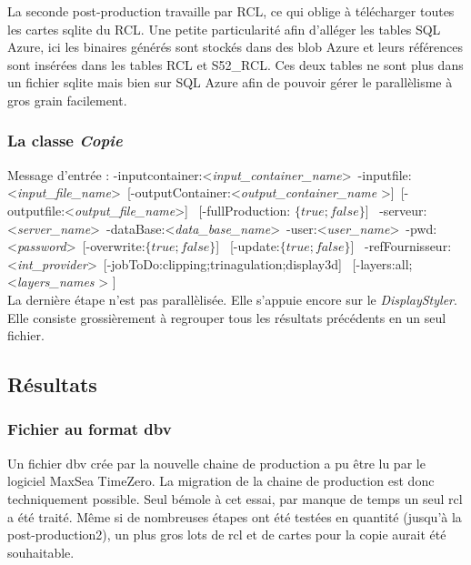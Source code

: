 La seconde post-production travaille par RCL, ce qui oblige à
télécharger toutes les cartes sqlite du RCL. Une petite particularité
afin d'alléger les tables SQL Azure, ici les binaires générés sont
stockés dans des blob Azure et leurs références sont insérées dans les
tables RCL et S52\_RCL. Ces deux tables ne sont plus dans un fichier
sqlite mais bien sur SQL Azure afin de pouvoir gérer le parallèlisme à
gros grain facilement.

\subsubsection{La classe \textit{Copie}}
Message d'entrée : 
-inputcontainer:\textless \textit{input\_container\_name}\textgreater \   
-inputfile:\textless \textit{input\_file\_name}\textgreater \ 
[-outputContainer:\textless \textit{output\_container\_name} \textgreater ]\  
[-outputfile:\textless \textit{output\_file\_name}\textgreater ] \ 
[-fullProduction: $\{true;false\}$] \ 
-serveur:\textless \textit{server\_name}\textgreater \   
-dataBase:\textless \textit{data\_base\_name}\textgreater \   
-user:\textless \textit{user\_name}\textgreater  \ 
-pwd:\textless \textit{password}\textgreater  \ 
[-overwrite:$\{true;false\}$] \ 
[-update:$\{true;false\}$] \ 
-refFournisseur:\textless \textit{int\_provider}\textgreater \   
[-jobToDo:{clipping;trinagulation;display3d}] \ 
[-layers:{all;\textless \textit{layers\_names} \textgreater} ] \\

La dernière étape n'est pas parallèlisée. Elle s'appuie encore sur le
\textit{DisplayStyler}. Elle consiste grossièrement à regrouper tous
les résultats précédents en un seul fichier.




%
%

\subsection{Résultats}

\subsubsection{Fichier au format dbv}

Un fichier dbv crée par la nouvelle chaine de production a pu être
lu par le logiciel MaxSea TimeZero. La migration de la chaine de
production est donc techniquement possible. Seul bémole à cet essai,
par manque de temps un seul rcl a été traité. Même si de nombreuses
étapes ont été testées en quantité (jusqu'à la post-production2), un
plus gros lots de rcl et de cartes pour la copie aurait été souhaitable.

